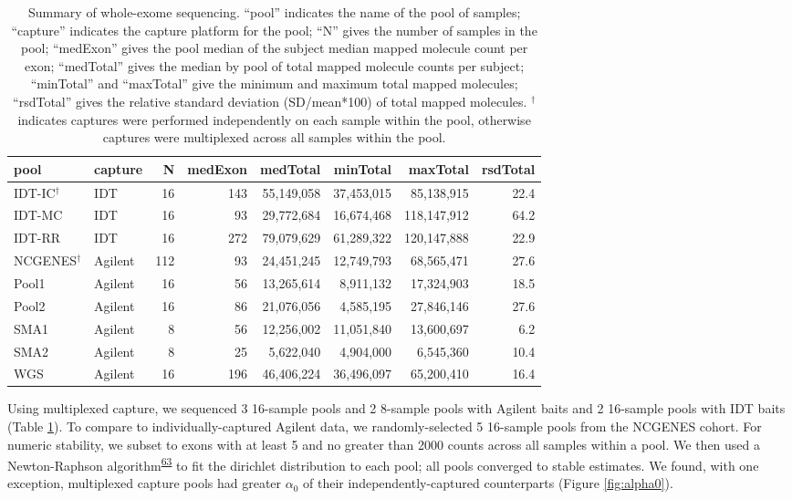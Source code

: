\documentclass[11pt,letterpaper]{book}
\begin{document}
\begin{table}

\caption[Summary of whole-exome sequencing for CNV project.]{\label{tab:poolSummary}Summary of whole-exome sequencing. ``pool'' indicates the name of the pool of samples; ``capture'' indicates the capture platform for the pool; ``N'' gives the number of samples in the pool; ``medExon'' gives the pool median of the subject median mapped molecule count per exon; ``medTotal'' gives the median by pool of total mapped molecule counts per subject; ``minTotal'' and ``maxTotal'' give the minimum and maximum total mapped molecules; ``rsdTotal'' gives the relative standard deviation (SD/mean*100) of total mapped molecules. \(^\dagger\) indicates captures were performed independently on each sample within the pool, otherwise captures were multiplexed across all samples within the pool.}
\centering
\begin{tabular}[t]{llrrrrrr}
\toprule
pool & capture & N & medExon & medTotal & minTotal & maxTotal & rsdTotal\\
\midrule
IDT-IC$^\dagger$ & IDT & 16 & 143 & 55,149,058 & 37,453,015 & 85,138,915 & 22.4\\
IDT-MC & IDT & 16 & 93 & 29,772,684 & 16,674,468 & 118,147,912 & 64.2\\
IDT-RR & IDT & 16 & 272 & 79,079,629 & 61,289,322 & 120,147,888 & 22.9\\
NCGENES$^\dagger$ & Agilent & 112 & 93 & 24,451,245 & 12,749,793 & 68,565,471 & 27.6\\
Pool1 & Agilent & 16 & 56 & 13,265,614 & 8,911,132 & 17,324,903 & 18.5\\
\addlinespace
Pool2 & Agilent & 16 & 86 & 21,076,056 & 4,585,195 & 27,846,146 & 27.6\\
SMA1 & Agilent & 8 & 56 & 12,256,002 & 11,051,840 & 13,600,697 & 6.2\\
SMA2 & Agilent & 8 & 25 & 5,622,040 & 4,904,000 & 6,545,360 & 10.4\\
WGS & Agilent & 16 & 196 & 46,406,224 & 36,496,097 & 65,200,410 & 16.4\\
\bottomrule
\end{tabular}
\end{table}

Using multiplexed capture, we sequenced 3 16-sample pools and 2 8-sample pools with Agilent baits and 2 16-sample pools with IDT baits (Table \ref{tab:poolSummary}).
To compare to individually-captured Agilent data, we randomly-selected 5 16-sample pools from the NCGENES cohort.
For numeric stability, we subset to exons with at least 5 and no greater than 2000 counts across all samples within a pool.
We then used a Newton-Raphson algorithm\textsuperscript{\protect\hyperlink{ref-minka:2000aa}{63}} to fit the dirichlet distribution to each pool; all pools converged to stable estimates.
We found, with one exception, multiplexed capture pools had greater \(\alpha_0\) of their independently-captured counterparts (Figure \ref{fig:alpha0}).
\end{document}
